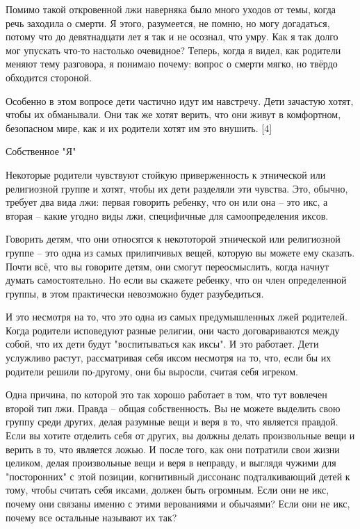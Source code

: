 \documentclass[ebook,12pt,oneside,openany]{memoir}
\begin{document}
Помимо такой откровенной лжи наверняка было много уходов от темы,
когда речь заходила о смерти. Я этого, разумеется, не помню, но могу
догадаться, потому что до девятнадцати лет я так и не осознал, что
умру. Как я так долго мог упускать что-то настолько очевидное? Теперь,
когда я видел, как родители меняют тему разговора, я понимаю почему:
вопрос о смерти мягко, но твёрдо обходится стороной.

Особенно в этом вопросе дети частично идут им навстречу. Дети зачастую
хотят, чтобы их обманывали. Они так же хотят верить, что они живут в
комфортном, безопасном мире, как и их родители хотят им это внушить.
[4]

Собственное "Я"

Некоторые родители чувствуют стойкую приверженность к этнической или
религиозной группе и хотят, чтобы их дети разделяли эти чувства. Это,
обычно, требует два вида лжи: первая говорить ребенку, что он или она
-- это икс, а вторая -- какие угодно виды лжи, специфичные для
самоопределения иксов.

Говорить детям, что они относятся к некототорой этнической или
религиозной группе -- это одна из самых прилипчивых вещей, которую вы
можете ему сказать. Почти всё, что вы говорите детям, они смогут
переосмыслить, когда начнут думать самостоятельно. Но если вы скажете
ребенку, что он член определенной группы, в этом практически
невозможно будет разубедиться.

И это несмотря на то, что это одна из самых предумышленных лжей
родителей. Когда родители исповедуют разные религии, они часто
договариваются между собой, что их дети будут "воспитываться как
иксы". И это работает. Дети услужливо растут, рассматривая себя иксом
несмотря на то, что, если бы их родители решили по-другому, они бы
выросли, считая себя игреком.

Одна причина, по которой это так хорошо работает в том, что тут
вовлечен второй тип лжи. Правда -- общая собственность. Вы не можете
выделить свою группу среди других, делая разумные вещи и веря в то,
что является правдой. Если вы хотите отделить себя от других, вы
должны делать произвольные вещи и верить в то, что является ложью. И
после того, как они потратили свои жизни целиком, делая произвольные
вещи и веря в неправду, и выглядя чужими для "посторонних" с этой
позиции, когнитивный диссонанс подталкивающий детей к тому, чтобы
считать себя иксами, должен быть огромным. Если они не икс, почему они
связаны именно с этими верованиями и обычаями? Если они не икс, почему
все остальные называют их так?
\end{document}
